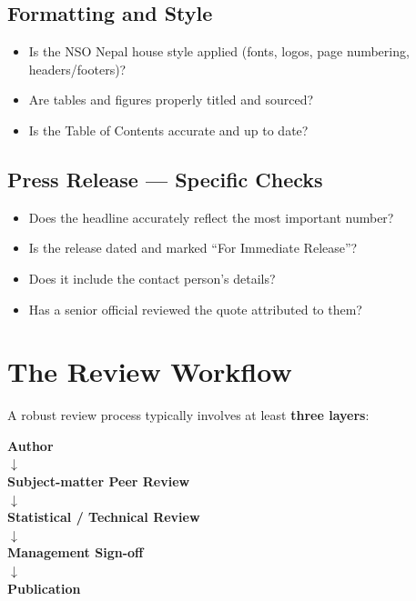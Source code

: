 \documentclass[11pt,a4paper,oneside]{book}
\begin{document}
\subsection*{Formatting and Style}
\begin{itemize}
    \item[\(\square\)] Is the NSO Nepal house style applied (fonts, logos, page numbering, headers/footers)?
    \item[\(\square\)] Are tables and figures properly titled and sourced?
    \item[\(\square\)] Is the Table of Contents accurate and up to date?
\end{itemize}

\subsection*{Press Release --- Specific Checks}
\begin{itemize}
    \item[\(\square\)] Does the headline accurately reflect the most important number?
    \item[\(\square\)] Is the release dated and marked ``For Immediate Release''?
    \item[\(\square\)] Does it include the contact person's details?
    \item[\(\square\)] Has a senior official reviewed the quote attributed to them?
\end{itemize}

\section{The Review Workflow}

A robust review process typically involves at least \textbf{three layers}:

\begin{center}
\begin{tcolorbox}[nsolightbox, width=0.8\textwidth, halign=center]
    \textbf{\color{nsoblue}Author}\\
    \(\downarrow\)\\
    \textbf{\color{nsoblue}Subject-matter Peer Review}\\
    \(\downarrow\)\\
    \textbf{\color{nsoblue}Statistical / Technical Review}\\
    \(\downarrow\)\\
    \textbf{\color{nsoblue}Management Sign-off}\\
    \(\downarrow\)\\
    \textbf{\color{nsored}Publication}
\end{tcolorbox}
\end{center}
\end{document}
